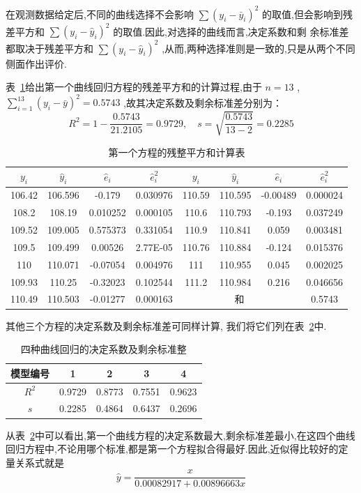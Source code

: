 在观测数据给定后,不同的曲线选择不会影响 $\sum (y_i-\bar{y}_i)^2$ 的取值,但会影响到残差平方和 $\sum (y_i-\hat{y}_i)^2$ 的取值.因此,对选择的曲线而言,决定系数和剩
余标准差都取决于残差平方和 $\sum (y_i-\hat{y}_i)^2$ ,从而,两种选择准则是一致的,只是从两个不同侧面作出评价.

表~\ref{tab:8.5.4}给出第一个曲线回归方程的残差平方和的计算过程,由于 $n=13$ , $\sum\limits_{i=1}^{13}(y_i-\bar{y})^2=0.5743$ ,故其决定系数及剩余标准差分别为：
\begin{equation}
R^{2}=1-\frac{0.5743}{21.2105}=0.9729, \quad s=\sqrt{\frac{0.5743}{13-2}}=0.2285
\end{equation}
\begin{table}[htbp]
    \centering
    \caption{第一个方程的残整平方和计算表}
    \begin{tabular}{cccc|cccc}
        \toprule
     $y_i$   &  $\hat{y}_i$  &  $\hat{e}_i$  &  $\hat{e}_i^2$  &  $y_i$   &  $\hat{y}_i$  &  $\hat{e}_i$  &  $\hat{e}_i^2$  \\\midrule
        106.42 & 106.596 & -0.179 & 0.030976 & 110.59 & 110.595 & -0.00489 & 0.000024 \\
        108.2 & 108.19 & 0.010252 & 0.000105 & 110.6 & 110.793 & -0.193 & 0.037249 \\
        109.52 & 109.005 & 0.575373 & 0.331054 & 110.9 & 110.841 & 0.059 & 0.003481 \\
        109.5 & 109.499 & 0.00526 & 2.77E-05 & 110.76 & 110.884 & -0.124 & 0.015376 \\
        110   & 110.071 & -0.07054 & 0.004976 & 111   & 110.955 & 0.045 & 0.002025 \\
        109.93 & 110.25 & -0.32023 & 0.102544 & 111.2 & 110.984 & 0.216 & 0.046656 \\
        110.49 & 110.503 & -0.01277 & 0.000163 & \multicolumn{3}{c}{和} & 0.5743 \\\bottomrule
    \end{tabular}%
    \label{tab:8.5.4}%
\end{table}%
其他三个方程的决定系数及剩余标准差可同样计算, 我们将它们列在表~\ref{tab:8.5.5}中.
\begin{table}[htb]
    \centering
    \caption{四种曲线回归的决定系数及剩余标准整}
    \begin{tabular}{ccccc}
    \toprule
    模型编号  & 1      & 2      & 3      & 4      \\
    \midrule
    $R^2$    & 0.9729 & 0.8773 & 0.7551 & 0.9623 \\
    $s$      & 0.2285 & 0.4864 & 0.6437 & 0.2696 \\
    \bottomrule
    \end{tabular}%
    \label{tab:8.5.5}%
\end{table}%
从表~\ref{tab:8.5.5}中可以看出,第一个曲线方程的决定系数最大,剩余标准差最小,在这四个曲线回归方程中,不论用哪个标准,都是第一个方程拟合得最好.因此,近似得比较好的定量关系式就是
\begin{equation}
\hat{y}=\frac{x}{0.00082917 + 0.008 96663 x}  
\end{equation}

